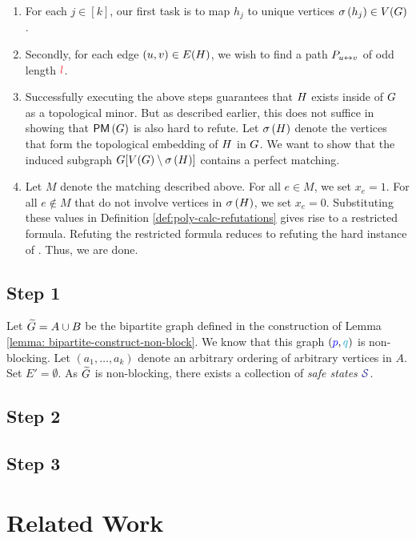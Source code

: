 \documentclass[11pt]{article}
\newcommand{\PerfectMatching}[1]{\mathsf{PM}\left(#1\right)}
\begin{document}
\begin{enumerate}
	\item For each $j \in [k]$, our first task is to map $h_j$ to unique vertices $\sigma\left(h_j\right) \in V(G)$. 
	\item Secondly, for each edge $(u,v) \in E(H)$, we wish to find a path $P_{u \leftrightarrow v}$ of odd length $\textcolor{red}{l}$.
	\item Successfully executing the above steps guarantees that $H$ exists inside of $G$ as a topological minor. But as described earlier, this does not suffice in showing that $\PerfectMatching{\Graph}$ is also hard to refute. Let $\sigma\left(H\right)$ denote the vertices that form the topological embedding of $H$ in $G$. We want to show that the induced subgraph $G[V(G) \setminus \sigma\left(H\right)]$ contains a perfect matching. 
	\item Let $M$ denote the matching described above. For all $e \in M$, we set $x_e =1$. For all $e \notin M$ that do not involve vertices in $\sigma\left(H\right)$, we set $x_e = 0$. Substituting these values in Definition \ref{def:poly-calc-refutations} gives rise to a restricted formula. Refuting the restricted formula reduces to refuting the hard instance of . Thus, we are done.
\end{enumerate}

\subsection{Step 1}

Let $\widetilde{G} = A \cup B$ be the bipartite graph defined in the construction of Lemma \ref{lemma: bipartite-construct-non-block}.
We know that this graph $(\pee, \qu)$ is non-blocking.
Let $(a_1, \dots, a_k)$ denote an arbitrary ordering of arbitrary vertices in $A$.
Set $E' = \emptyset$. 
As $\widetilde{G}$ is non-blocking, there exists a collection of \emph{safe states} $\SafeStates$.


\subsection{Step 2}

\subsection{Step 3}

\section{Related Work}

\clearpage


\end{document}
